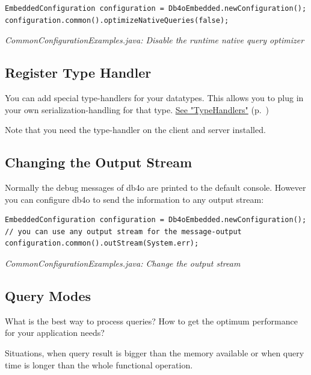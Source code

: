 \begin{lstlisting}
EmbeddedConfiguration configuration = Db4oEmbedded.newConfiguration();
configuration.common().optimizeNativeQueries(false);
\end{lstlisting}

{\small\itshape CommonConfigurationExamples.java: Disable the runtime native query optimizer\par}
\medskip

\subsection{Register Type Handler}
\label{ref:configuration-common-register-type-handler}

You can add special type-handlers for your datatypes. This allows you to plug in your own serialization-handling for that type. \hyperref[ref:advanced-topics-type-handling-typehandlers]{See "TypeHandlers"} (p.~\pageref{ref:advanced-topics-type-handling-typehandlers})

Note that you need the type-handler on the client and server installed.

\subsection{Changing the Output Stream}
\label{ref:configuration-common-out-stream}

Normally the debug messages of db4o are printed to the default console. However you can configure db4o to send the information to any output stream:

\begin{lstlisting}
EmbeddedConfiguration configuration = Db4oEmbedded.newConfiguration();
// you can use any output stream for the message-output
configuration.common().outStream(System.err);
\end{lstlisting}

{\small\itshape CommonConfigurationExamples.java: Change the output stream\par}
\medskip

\subsection{Query Modes}
\label{ref:configuration-common-query-modes}

What is the best way to process queries? How to get the optimum performance for your application needs?

Situations, when query result is bigger than the memory available or when query time is longer than the whole functional operation.

